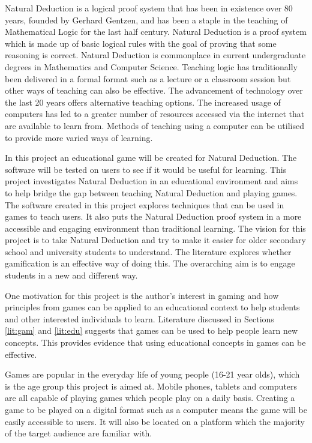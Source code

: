\documentclass[FYP.tex]{subfiles}
\begin{document}
Natural Deduction is a logical proof system that has been in existence over 80 years, founded by Gerhard Gentzen, and has been a staple in the teaching of Mathematical Logic for the last half century. Natural Deduction is a proof system which is made up of basic logical rules with the goal of proving that some reasoning is correct. \cite{intro} Natural Deduction is commonplace in current undergraduate degrees in Mathematics and Computer Science. Teaching logic has traditionally been delivered in a formal format such as a lecture or a classroom session but other ways of teaching can also be effective. The advancement of technology over the last 20 years offers alternative teaching options. The increased usage of computers has led to a greater number of resources accessed via the internet that are available to learn from. Methods of teaching using a computer can be utilised to provide more varied ways of learning.  

In this project an educational game will be created for Natural Deduction. The software will be tested on users to see if it would be useful for learning. This project investigates Natural Deduction in an educational environment and aims to help bridge the gap between teaching Natural Deduction and playing games. The software created in this project explores techniques that can be used in games to teach users. It also puts the Natural Deduction proof system in a more accessible and engaging environment than traditional learning. The vision for this project is to take Natural Deduction and try to make it easier for older secondary school and university students to understand. The literature explores whether gamification is an effective way of doing this. The overarching aim is to engage students in a new and different way. 

One motivation for this project is the author's interest in gaming and how principles from games can be applied to an educational context to help students and other interested individuals to learn. Literature discussed in Sections \ref{lit:gam} and \ref{lit:edu} suggests that games can be used to help people learn new concepts. This provides evidence that using educational concepts in games can be effective. 

Games are popular in the everyday life of young people (16-21 year olds), which is the age group this project is aimed at. Mobile phones, tablets and computers are all capable of playing games which people play on a daily basis. Creating a game to be played on a digital format such as a computer means the game will be easily accessible to users. It will also be located on a platform which the majority of the target audience are familiar with. 
\end{document}

